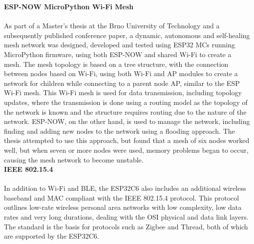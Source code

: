 
\textbf{ESP-NOW MicroPython Wi-Fi Mesh}\\\\
As part of a Master's thesis at the Brno University of Technology and a subsequently published conference paper, a dynamic, autonomous and self-healing mesh network was designed, developed and tested using ESP32 MCs running MicroPython firmware, using both ESP-NOW and shared Wi-Fi to create a mesh. The mesh topology is based on a tree structure, with the connection between nodes based on Wi-Fi, using both Wi-Fi and AP modules to create a network for children while connecting to a parent node AP, similar to the ESP Wi-Fi mesh. This Wi-Fi mesh is used for data transmission, including topology updates, where the transmission is done using a routing model as the topology of the network is known and the structure requires routing due to the nature of the network. ESP-NOW, on the other hand, is used to manage the network, including finding and adding new nodes to the network using a flooding approach.
The thesis attempted to use this approach, but found that a mesh of six nodes worked well, but when seven or more nodes were used, memory problems began to occur, causing the mesh network to become unstable. 
\citep{sestak_dynamic_2022, sestak_dynamic_2022-1}
\\

\textbf{IEEE 802.15.4}\\\\
In addition to Wi-Fi and BLE, the ESP32C6 also includes an additional wireless baseband and MAC compliant with the IEEE 802.15.4 protocol. This protocol outlines low-rate wireless personal area networks with low complexity, low data rates and very long durations, dealing with the OSI physical and data link layers. The standard is the basis for protocols such as Zigbee and Thread, both of which are supported by the ESP32C6. \citep{noauthor_ieee_2024, noauthor_ieee_2009, espressif_systems_esp32-c6_2024, seeed_studio_seeed_2024-1, seeed_studio_seeed_2024}



